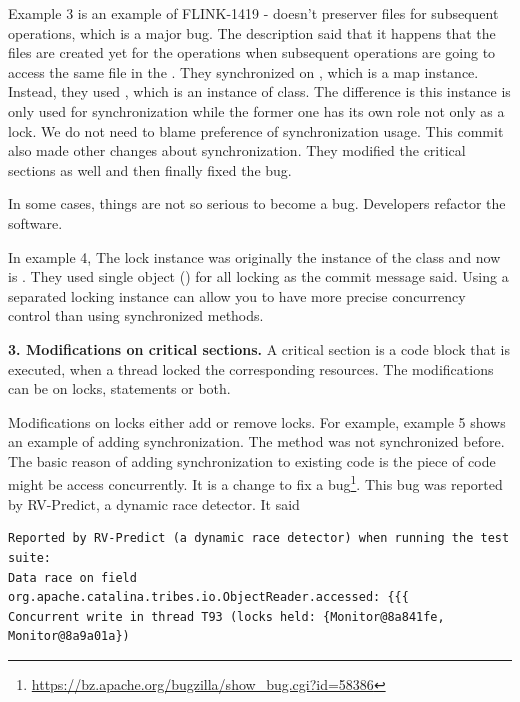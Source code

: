 Example 3 is an example of FLINK-1419 -  doesn't preserver files for subsequent operations, which is a major bug. The description said that it happens that the files are created yet for the operations when subsequent operations are going to access the same file in the . They synchronized on , which is a map instance. Instead, they used , which is an instance of  class. The difference is this instance is only used for synchronization while the former one has its own role not only as a lock. We do not need to blame preference of synchronization usage. This commit also made other changes about synchronization. They modified the critical sections as well and then finally fixed the bug.


In some cases, things are not so serious to become a bug. Developers refactor the software.

In example 4, The lock instance was originally the instance of the class and now is . They used single object () for all locking as the commit message said. Using a separated locking instance can allow you to have more precise concurrency control than using synchronized methods.

\noindent
\textbf{3. Modifications on critical sections.} A critical section is a code block that is executed, when a thread locked the corresponding resources. The modifications can be on locks, statements or both.%

Modifications on locks either add or remove locks. For example, example 5 shows an example of adding synchronization. The method was not synchronized before. The basic reason of adding synchronization to existing code is the piece of code might be access concurrently. It is a change to fix a bug\footnote{\url{https://bz.apache.org/bugzilla/show\_bug.cgi?id=58386}}. This bug was reported by RV-Predict, a dynamic race detector. It said

\begin{lstlisting}
Reported by RV-Predict (a dynamic race detector) when running the test suite:
Data race on field org.apache.catalina.tribes.io.ObjectReader.accessed: {{{
Concurrent write in thread T93 (locks held: {Monitor@8a841fe, Monitor@8a9a01a})
\end{lstlisting}

